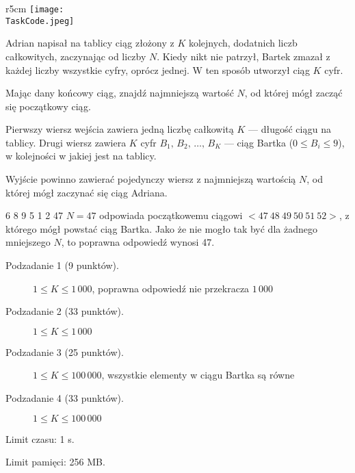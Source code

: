 \documentclass{boi2014-pl}
\renewcommand{\TaskCode}{sequence}
\begin{document}
    \begin{wrapfigure}[5]{r}{5cm}
        \vspace{-24pt}
		\texttt{[image: \\TaskCode.jpeg]}
	\end{wrapfigure}

    Adrian napisał na tablicy ciąg złożony z $K$ kolejnych, dodatnich liczb całkowitych, zaczynając od liczby $N$.
    Kiedy nikt nie patrzył, Bartek zmazał z każdej liczby wszystkie cyfry, oprócz jednej.
    W ten sposób utworzył ciąg $K$ cyfr.

    \Task

    Mając dany końcowy ciąg, znajdź najmniejszą wartość $N$, od której mógł zacząć się początkowy ciąg.

    \Input

    Pierwszy wiersz wejścia zawiera jedną liczbę całkowitą $K$ --- długość ciągu na tablicy.
    Drugi wiersz zawiera $K$ cyfr $B_1,\, B_2 ,\, \ldots ,\, B_K$ --- ciąg Bartka ($0 \le B_i \le 9$), w kolejności w jakiej jest na tablicy.
    
    \Output

    Wyjście powinno zawierać pojedynczy wiersz z najmniejszą wartością $N$, od której mógł zaczynać się ciąg Adriana.
    
    \Example

    \example
    {
        6 8 9 5 1 2
    }
    {
        47
    }
    {
        $N = 47$ odpowiada początkowemu ciągowi $<47\ 48\ 49\ 50\ 51\ 52>$, z którego mógł powstać ciąg Bartka. Jako że nie mogło tak być dla żadnego mniejszego $N$, to poprawna odpowiedź wynosi 47.
    }

\Scoring

\begin{description}
    \item[Podzadanie 1 (9 punktów).] $1 \le K \le 1\,000$, poprawna odpowiedź nie przekracza $1\,000$
    \item[Podzadanie 2 (33 punktów).] $1 \le K \le 1\,000$
    \item[Podzadanie 3 (25 punktów).] $1 \le K \le 100\,000$, wszystkie elementy w ciągu Bartka są równe
    \item[Podzadanie 4 (33 punktów).] $1 \le K \le 100\,000$
\end{description}

\Constraints

Limit czasu: 1 s.

Limit pamięci: 256 MB.
\end{document}
